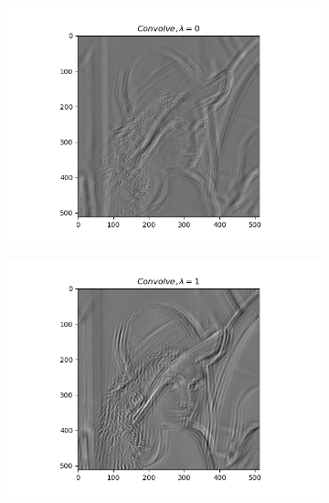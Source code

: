 \documentclass{article} %
\begin{document}
    \begin{figure}[H]
        \centering
        \begin{subfigure}[b]{0.49\textwidth}
            \centering
            \includegraphics[width=\textwidth]{q44_img0.png}
        \end{subfigure}
        \begin{subfigure}[b]{0.49\textwidth}
            \centering
            \includegraphics[width=\textwidth]{q44_img1.png}
        \end{subfigure}
        \begin{subfigure}[b]{0.49\textwidth}
            \centering

\end{subfigure}
\end{figure}
\end{document}
